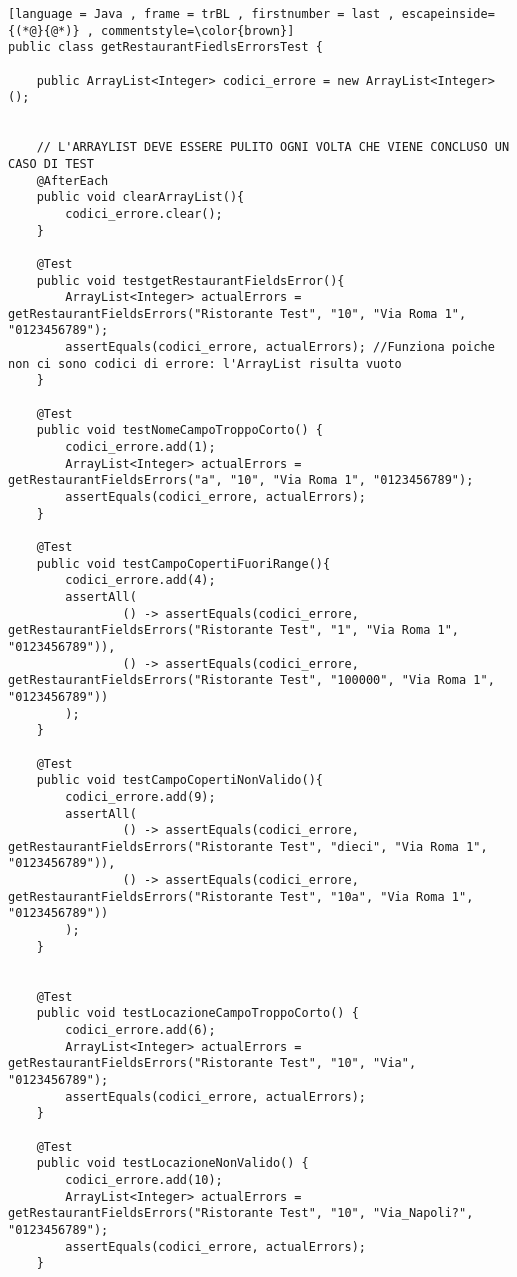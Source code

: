 \begin{lstlisting}[language = Java , frame = trBL , firstnumber = last , escapeinside={(*@}{@*)} , commentstyle=\color{brown}]
public class getRestaurantFiedlsErrorsTest {

    public ArrayList<Integer> codici_errore = new ArrayList<Integer>();


    // L'ARRAYLIST DEVE ESSERE PULITO OGNI VOLTA CHE VIENE CONCLUSO UN CASO DI TEST
    @AfterEach
    public void clearArrayList(){
        codici_errore.clear();
    }

    @Test
    public void testgetRestaurantFieldsError(){
        ArrayList<Integer> actualErrors = getRestaurantFieldsErrors("Ristorante Test", "10", "Via Roma 1", "0123456789");
        assertEquals(codici_errore, actualErrors); //Funziona poiche non ci sono codici di errore: l'ArrayList risulta vuoto
    }

    @Test
    public void testNomeCampoTroppoCorto() {
        codici_errore.add(1);
        ArrayList<Integer> actualErrors = getRestaurantFieldsErrors("a", "10", "Via Roma 1", "0123456789");
        assertEquals(codici_errore, actualErrors);
    }

    @Test
    public void testCampoCopertiFuoriRange(){
        codici_errore.add(4);
        assertAll(
                () -> assertEquals(codici_errore, getRestaurantFieldsErrors("Ristorante Test", "1", "Via Roma 1", "0123456789")),
                () -> assertEquals(codici_errore, getRestaurantFieldsErrors("Ristorante Test", "100000", "Via Roma 1", "0123456789"))
        );
    }

    @Test
    public void testCampoCopertiNonValido(){
        codici_errore.add(9);
        assertAll(
                () -> assertEquals(codici_errore, getRestaurantFieldsErrors("Ristorante Test", "dieci", "Via Roma 1", "0123456789")),
                () -> assertEquals(codici_errore, getRestaurantFieldsErrors("Ristorante Test", "10a", "Via Roma 1", "0123456789"))
        );
    }


    @Test
    public void testLocazioneCampoTroppoCorto() {
        codici_errore.add(6);
        ArrayList<Integer> actualErrors = getRestaurantFieldsErrors("Ristorante Test", "10", "Via", "0123456789");
        assertEquals(codici_errore, actualErrors);
    }

    @Test
    public void testLocazioneNonValido() {
        codici_errore.add(10);
        ArrayList<Integer> actualErrors = getRestaurantFieldsErrors("Ristorante Test", "10", "Via_Napoli?", "0123456789");
        assertEquals(codici_errore, actualErrors);
    }



\end{lstlisting}
